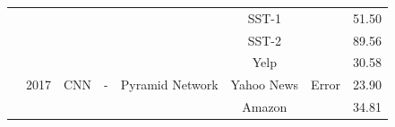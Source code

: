 \documentclass[12pt, a4paper, oneside]{report}
\begin{document}
\begin{tiny}
\begin{latin}
\begin{longtable}{|c|c|c|c|c|c|cc|}
                                                                              &                       &                                   &                                         &                                                                                                        & SST-1                                 & \multicolumn{1}{c|}{}                                                                                                              & 51.50  \\ \cline{6-6} \cline{8-8} 
                                                                              &                       &                                   &                                         &                                                                                                        & SST-2                                 & \multicolumn{1}{c|}{}                                                                                                              & 89.56  \\ \hline
        \multirow{3}{*}{\cite{johnson-zhang-2017-deep}}      & \multirow{3}{*}{2017} & \multirow{3}{*}{CNN}              & \multirow{3}{*}{-}                      & \multirow{3}{*}{Pyramid Network}                                                                       & Yelp                                  & \multicolumn{1}{c|}{\multirow{3}{*}{Error}}                                                                                        & 30.58  \\ \cline{6-6} \cline{8-8} 
                                                                              &                       &                                   &                                         &                                                                                                        & Yahoo News                            & \multicolumn{1}{c|}{}                                                                                                              & 23.90  \\ \cline{6-6} \cline{8-8} 
                                                                              &                       &                                   &                                         &                                                                                                        & Amazon                                & \multicolumn{1}{c|}{}                                                                                                              & 34.81  \\ \hline

\end{longtable}
\end{latin}
\end{tiny}
\end{document}
